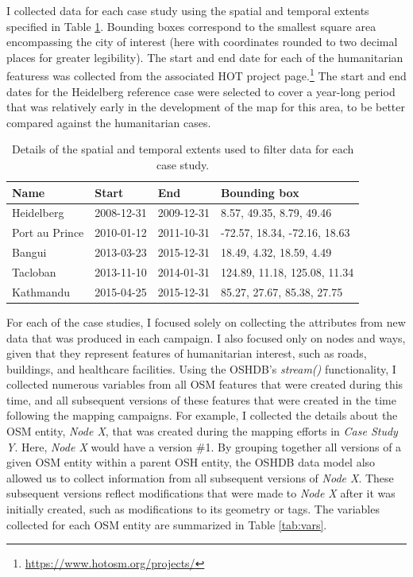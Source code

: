 I collected data for each case study using the spatial and temporal extents specified in Table \ref{tab:cases}. Bounding boxes correspond to the smallest square area encompassing the city of interest (here with coordinates rounded to two decimal places for greater legibility). The start and end date for each of the humanitarian featuress was collected from the associated HOT project page.\footnote{\url{https://www.hotosm.org/projects/}} The start and end dates for the Heidelberg reference case were selected to cover a year-long period that was relatively early in the development of the map for this area, to be better compared against the humanitarian cases. 

\begin{table}
\centering
\caption{Details of the spatial and temporal extents used to filter data for each case study.}
\label{tab:cases}
\begin{tabular}{llll}
\toprule
Name                     & Start      & End        & Bounding box                 \\
\midrule
Heidelberg               & 2008-12-31 & 2009-12-31 & 8.57, 49.35, 8.79, 49.46     \\
Port au Prince         & 2010-01-12 & 2011-10-31 & -72.57, 18.34, -72.16, 18.63 \\
Bangui & 2013-03-23 & 2015-12-31 & 18.49, 4.32, 18.59, 4.49     \\
Tacloban           & 2013-11-10 & 2014-01-31 & 124.89, 11.18, 125.08, 11.34 \\
Kathmandu         & 2015-04-25 & 2015-12-31 & 85.27, 27.67, 85.38, 27.75  \\
\bottomrule
\end{tabular}
\end{table}

For each of the case studies, I focused solely on collecting the attributes from new data that was produced in each campaign. I also focused only on nodes and ways, given that they represent features of humanitarian interest, such as roads, buildings, and healthcare facilities. Using the OSHDB's \textit{stream()} functionality, I collected numerous variables from all OSM features that were created during this time, and all subsequent versions of these features that were created in the time following the mapping campaigns. For example, I collected the details about the OSM entity, \textit{Node X}, that was created during the mapping efforts in \textit{Case Study Y}. Here, \textit{Node X} would have a version \#1. By grouping together all versions of a given OSM entity within a parent OSH entity, the OSHDB data model also allowed us to collect information from all subsequent versions of \textit{Node X}. These subsequent versions reflect modifications that were made to \textit{Node X} after it was initially created, such as modifications to its geometry or tags. The variables collected for each OSM entity are summarized in Table \ref{tab:vars}. 

